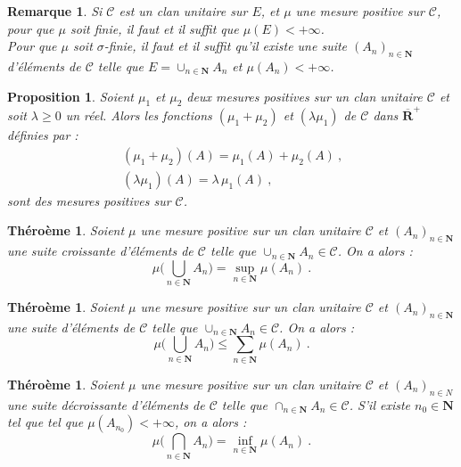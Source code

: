 \documentclass{scrreport}
\theoremstyle{def}
\theoremstyle{thm}
\newtheorem{theorem}[definition]{Théroème}
\theoremstyle{prop}
\newtheorem{proposition}[definition]{Proposition}
\theoremstyle{rem}
\newtheorem{remark}[definition]{Remarque}
\numberwithin{definition}{section}
\numberwithin{lemma}{section}
\numberwithin{proposition}{section}
\numberwithin{theorem}{section}
\numberwithin{corol}{section}
\numberwithin{notation}{section}
\numberwithin{example}{section}
\numberwithin{exercise}{section}
\numberwithin{remark}{section}
\newcommand{\N}{\mathbf{N}}
\newcommand{\R}{\mathbf{R}}
\newcommand{\RR}{\overline{\R}}
\newcommand{\scrC}{\mathscr{C}}
\begin{document}
\begin{remark}\label{rem2:1:10}
	Si \(\scrC\) est un clan unitaire sur \(E\), et \(\mu\) une mesure positive sur \(\scrC\), pour que \(\mu\) soit finie, il faut et il suffit que \(\mu(E) < +\infty\). \\ \indent
	Pour que \(\mu\) soit \(\sigma\)-finie, il faut et il suffit qu'il existe une suite \({(A_n)}_{n \in \N}\) d'éléments de \(\scrC\) telle que \(E = \cup_{n \in \N} A_n\) et \(\mu(A_n) < +\infty\).
\end{remark}

\begin{proposition}\label{prop2:1:11}
	Soient \(\mu_1\) et \(\mu_2\) deux mesures positives sur un clan unitaire \(\scrC\) et soit \(\lambda \geqslant 0\) un réel. Alors les fonctions \((\mu_1 + \mu_2)\) et \((\lambda\mu_1)\) de \(\scrC\) dans \(\RR^+\) définies par :
	\begin{gather*}
		(\mu_1 + \mu_2)(A) = \mu_1(A) + \mu_2(A) \: \text{,} \\
		(\lambda\mu_1)(A) = \lambda\,\mu_1(A) \: \text{,}
	\end{gather*}
	sont des mesures positives sur \(\scrC\).
\end{proposition}

\begin{theorem}\label{thm2:1:12}
	Soient \(\mu\) une mesure positive sur un clan unitaire \(\scrC\) et \({(A_n)}_{n \in \N}\) une suite croissante d'éléments de \(\scrC\) telle que \(\cup_{n \in \N} A_n \in \scrC\). On a alors :
	\[ \mu \Biggl( \bigcup_{n \in \N} A_n \Biggr) = \sup_{n \in \N} {\mu(A_n)} \: \text{.}\]
\end{theorem}

\begin{theorem}\label{thm2:1:13}
	Soient \(\mu\) une mesure positive sur un clan unitaire \(\scrC\) et \({(A_n)}_{n \in \N}\) une suite d'éléments de \(\scrC\) telle que \(\cup_{n \in \N} A_n \in \scrC\). On a alors :
	\[ \mu \Biggl( \bigcup_{n \in \N} A_n \Biggr) \leqslant \sum_{n \in \N} \mu(A_n) \: \text{.} \]
\end{theorem}

\begin{theorem}\label{thm2:1:14}
	Soient \(\mu\) une mesure positive sur un clan unitaire \(\scrC\) et \({(A_n)}_{n \in N}\) une suite décroissante d'éléments de \(\scrC\) telle que \(\cap_{n \in \N} A_n \in \scrC\). S'il existe \(n_0 \in \N\) tel que tel que \(\mu(A_{n_0}) < +\infty\), on a alors :
	\[ \mu \Biggl( \bigcap_{n \in \N} A_n \Biggr) = \inf_{n \in \N} {\mu(A_n)} \: \text{.} \]
\end{theorem}
\end{document}
